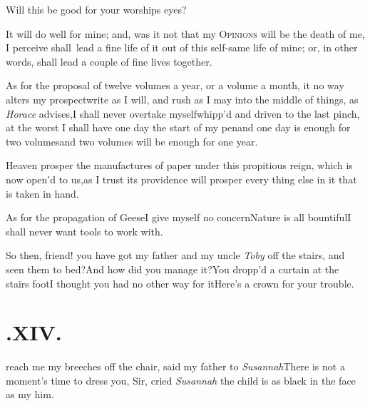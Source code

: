 \documentclass[twoside]{article}
\begin{document}
Will this be good for your worships eyes?

It will do well for mine; and, was it not that my
\textsc{Opinions} will be the death of me, I perceive shall\sic\ 
lead a fine life of it out of this self-same life of mine; or, in
other words, shall lead a couple of fine lives together.

As for the proposal of twelve volumes a year, or a volume a month, it no way alters my
prospect\tsk write as I will, and rush as I may into the middle
of things, as \textit{Horace} advises,\tsk I shall never overtake
myself\tsk whipp’d and driven to the last pinch, at the worst I
shall have one day the start of my pen\tsk and one day is enough
for two volumes\tsk and two volumes will be enough for one
year.\tsk

Heaven prosper the manufactures of paper under this propitious
reign, which is now open’d to us,\tsk as I trust its
pro\-vidence will prosper every thing else in it that is taken in
hand.\tsk\patch{As}

As for the propagation of Geese\tsk I give myself no
concern\tsk Nature is all bountiful\tsk I shall never want
tools to work with.

\tsk So then, friend! you have got my father and my uncle
\textit{Toby} off the stairs, and seen them to bed?\tsk And
how did you manage it?\tsk You dropp’d a curtain at
the stairs foot\tsk I thought you had no other way for
it\tsk Here’s a crown for your trouble.

\smallskip
\section{.\enspace XIV.}

 reach me my breeches\break 
off the chair, said my father to\break
\textit{Susannah}\tsh There is not a moment’s\break
time to dress you, Sir, cried \textit{Susannah}\tsk\break
the child is as black in the face as my\tsh{} 
\break
him.
\end{document}
